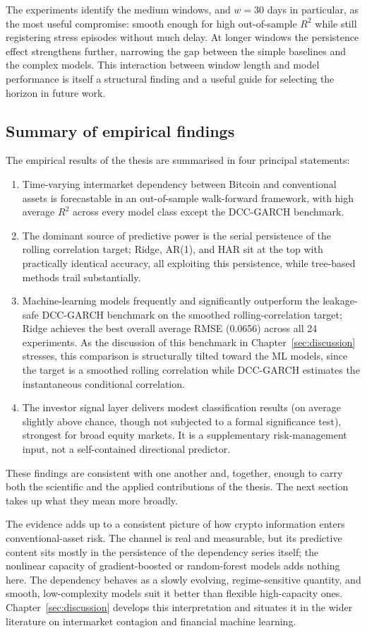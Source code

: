 The experiments identify the medium windows, and $w = 30$ days in particular, as the most useful compromise: smooth enough for high out-of-sample $R^2$ while still registering stress episodes without much delay. At longer windows the persistence effect strengthens further, narrowing the gap between the simple baselines and the complex models. This interaction between window length and model performance is itself a structural finding and a useful guide for selecting the horizon in future work.

\subsection{Summary of empirical findings}

The empirical results of the thesis are summarised in four principal statements:

\begin{enumerate}
    \item Time-varying intermarket dependency between Bitcoin and conventional assets is forecastable in an out-of-sample walk-forward framework, with high average $R^2$ across every model class except the DCC-GARCH benchmark.
    \item The dominant source of predictive power is the serial persistence of the rolling correlation target; Ridge, AR(1), and HAR sit at the top with practically identical accuracy, all exploiting this persistence, while tree-based methods trail substantially.
    \item Machine-learning models frequently and significantly outperform the leakage-safe DCC-GARCH benchmark on the smoothed rolling-correlation target; Ridge achieves the best overall average RMSE (0.0656) across all 24 experiments. As the discussion of this benchmark in Chapter~\ref{sec:discussion} stresses, this comparison is structurally tilted toward the ML models, since the target is a smoothed rolling correlation while DCC-GARCH estimates the instantaneous conditional correlation.
    \item The investor signal layer delivers modest classification results (on average slightly above chance, though not subjected to a formal significance test), strongest for broad equity markets. It is a supplementary risk-management input, not a self-contained directional predictor.
\end{enumerate}

These findings are consistent with one another and, together, enough to carry both the scientific and the applied contributions of the thesis. The next section takes up what they mean more broadly.

The evidence adds up to a consistent picture of how crypto information enters conventional-asset risk. The channel is real and measurable, but its predictive content sits mostly in the persistence of the dependency series itself; the nonlinear capacity of gradient-boosted or random-forest models adds nothing here. The dependency behaves as a slowly evolving, regime-sensitive quantity, and smooth, low-complexity models suit it better than flexible high-capacity ones. Chapter~\ref{sec:discussion} develops this interpretation and situates it in the wider literature on intermarket contagion and financial machine learning.
